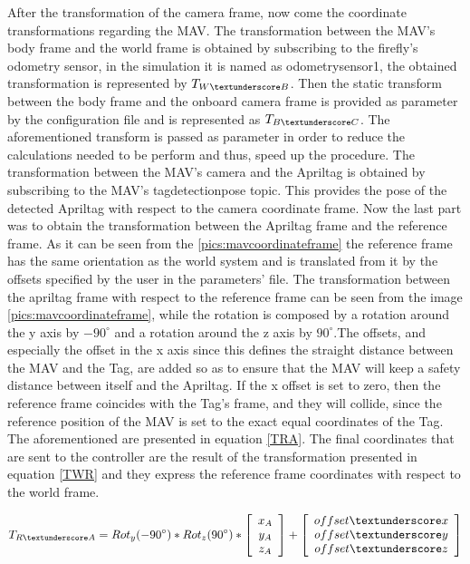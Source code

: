  After the transformation of the camera frame, now come the coordinate transformations regarding the MAV. The transformation between the MAV's body frame and the world frame is obtained by subscribing to the firefly's odometry sensor, in the simulation it is named as odometry\textunderscore sensor1, the obtained transformation is represented by $T_{W\textunderscore B}$. Then the static transform between the body frame and the onboard camera frame is provided as parameter by the configuration file and is represented as $T_{B\textunderscore C}$. The aforementioned transform is passed as parameter in order to reduce the calculations needed to be perform and thus, speed up the procedure. The transformation between the MAV's camera and the Apriltag is obtained by subscribing to the MAV's  tag\textunderscore detection\textunderscore pose topic. This provides the pose of the detected Apriltag with respect to the camera coordinate frame. Now the last part was to obtain the transformation between the Apriltag frame and the reference frame. As it can be seen from the \ref{pics:mavcoordinateframe} the reference frame has the same orientation as the world system and is translated from it by the offsets specified by the user in the parameters' file. The transformation between the apriltag frame with respect to the reference frame can be seen from the image \ref{pics:mavcoordinateframe}, while the rotation is composed by a rotation around the y axis by $-90^{\circ}$ and a rotation around the z axis by $90^{\circ}$.The offsets, and especially the offset in the x axis since this defines the straight distance between the MAV and the Tag, are added so as to ensure that the MAV will keep a safety distance between itself and the Apriltag. If the x offset is set to zero, then the reference frame coincides with the Tag's frame, and they will collide, since the reference position of the MAV is set to the exact equal coordinates of the Tag. The aforementioned are presented in equation \ref{TRA}. The final coordinates that are sent to the controller are the result of the transformation presented in equation \ref{TWR} and they express the reference frame coordinates with respect to the world frame.
 
 
 \begin{equation}
 \label{TRA}
 T_{R\textunderscore A} = Rot_y(-90^{\circ}) * Rot_z(90^{\circ}) * \left[\begin{array}{c}
 x_A\\ y_A \\z_A
 \end{array}\right] + \left[\begin{array}{c}offset\textunderscore x \\ offset\textunderscore y \\offset\textunderscore z \\ \end{array}\right]
 \end{equation}
 
